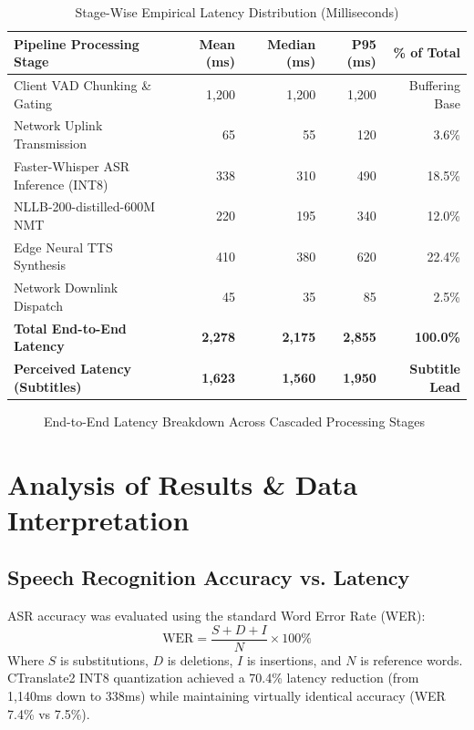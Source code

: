 \documentclass[12pt,a4paper]{report}
\begin{document}
\begin{table}[H]
\centering
\small
\caption{Stage-Wise Empirical Latency Distribution (Milliseconds)}
\label{tab:latency_dist}
\begin{tabularx}{\textwidth}{lrrrr}
\toprule
\textbf{Pipeline Processing Stage} & \textbf{Mean (ms)} & \textbf{Median (ms)} & \textbf{P95 (ms)} & \textbf{\% of Total} \\
\midrule
Client VAD Chunking \& Gating & 1,200 & 1,200 & 1,200 & Buffering Base \\
Network Uplink Transmission & 65 & 55 & 120 & 3.6\% \\
Faster-Whisper ASR Inference (INT8) & 338 & 310 & 490 & 18.5\% \\
NLLB-200-distilled-600M NMT & 220 & 195 & 340 & 12.0\% \\
Edge Neural TTS Synthesis & 410 & 380 & 620 & 22.4\% \\
Network Downlink Dispatch & 45 & 35 & 85 & 2.5\% \\
\midrule
\textbf{Total End-to-End Latency} & \textbf{2,278} & \textbf{2,175} & \textbf{2,855} & \textbf{100.0\%} \\
\textbf{Perceived Latency (Subtitles)} & \textbf{1,623} & \textbf{1,560} & \textbf{1,950} & \textbf{Subtitle Lead} \\
\bottomrule
\end{tabularx}
\end{table}

\begin{figure}[H]
  \centering
  \caption{End-to-End Latency Breakdown Across Cascaded Processing Stages}
  \label{fig:fig5_1}
\end{figure}

\section{Analysis of Results \& Data Interpretation}
\subsection{Speech Recognition Accuracy vs. Latency}
ASR accuracy was evaluated using the standard Word Error Rate (WER):
\begin{equation}
\text{WER} = \frac{S + D + I}{N} \times 100\%
\end{equation}
Where $S$ is substitutions, $D$ is deletions, $I$ is insertions, and $N$ is reference words.
CTranslate2 INT8 quantization achieved a 70.4\% latency reduction (from 1,140ms down to 338ms) while maintaining virtually identical accuracy (WER 7.4\% vs 7.5\%).
\end{document}
